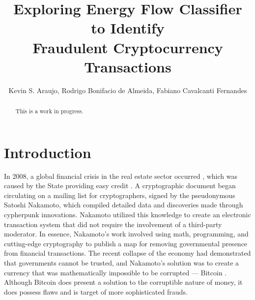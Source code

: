\documentclass[12pt]{article}
\title{Exploring Energy Flow Classifier to Identify \\ Fraudulent Cryptocurrency Transactions}
\author{Kevin S. Araujo\inst{1}, Rodrigo Bonifacio de Almeida\inst{1}, 
  Fabiano Cavalcanti Fernandes\inst{2} }
\begin{document}
 

\maketitle

\begin{abstract}
  This is a work in progress.
\end{abstract}

\section{Introduction} \label{sec:introduction}

In 2008, a global financial crisis in the real estate sector occurred \cite{bordo2008historical}, which was caused by
the State providing easy credit \cite{murphy2008analysis}. A cryptographic document began circulating on a mailing list
for cryptographers, signed by the pseudonymous Satoshi Nakamoto, which compiled detailed data and discoveries made
through cypherpunk innovations. Nakamoto utilized this knowledge to create an electronic transaction system that did not
require the involvement of a third-party moderator. In essence, Nakamoto's work involved using math, programming, and
cutting-edge cryptography to publish a map for removing governmental presence from financial transactions. The recent
collapse of the economy had demonstrated that governments cannot be trusted, and Nakamoto's solution was to create a
currency that was mathematically impossible to be corrupted --- Bitcoin \cite{nakamoto2008bitcoin}. Although Bitcoin does
present a solution to the corruptible nature of money, it does possess flaws and is target of more sophisticated frauds.
\end{document}
